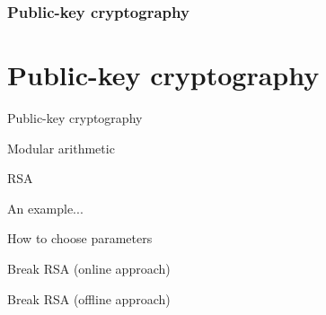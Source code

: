 \section{Public-key cryptography}
\part{Public-key cryptography}

\begin{frame}{Public-key cryptography}

\end{frame}

\begin{frame}{Modular arithmetic}

\end{frame}

\begin{frame}{RSA}

\end{frame}

\begin{frame}{An example...}

\end{frame}

\begin{frame}{How to choose parameters}

\end{frame}

\begin{frame}{Break RSA (online approach)}

\end{frame}

\begin{frame}{Break RSA (offline approach)}

\end{frame}
